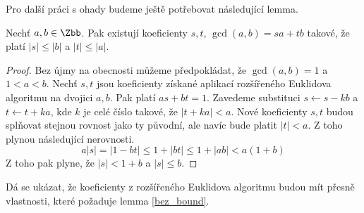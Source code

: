 Pro další práci s ohady budeme ještě potřebovat následující lemma.
\begin{lem} \label{bez_bound}
Nechť $ a, b \in \Zbb $. Pak existují koeficienty
$ s, t $, $ \gcd(a, b) = s a + t b $ takové, že platí $ |s| \leq |b| $ a
$ |t| \leq |a| $.
\end{lem}
\begin{proof}
Bez újmy na obecnosti můžeme předpokládat, že $ \gcd(a, b) = 1 $ a $ 1 < a < b $.
Nechť $ s, t $ jsou koeficienty získané aplikací rozšířeného Euklidova algoritmu
na dvojici $ a, b $. Pak platí $ a s + b t = 1 $. Zavedeme substituci
$ s \leftarrow s - k b $ a $ t \leftarrow t + k a $, kde $ k $ je celé číslo takové, že
$ |t + k a| < a $. Nové koeficienty $ s,t $ budou splňovat stejnou rovnost
jako ty původní, ale navíc bude platit $ |t| < a $. Z toho plynou následující
nerovnosti.
\begin{equation*}
    a |s| = | 1 - bt | \leq 1 + |bt| \leq 1 + |ab| < a(1 + b)
\end{equation*}
Z toho pak plyne, že $ |s| < 1 + b $ a $ |s| \leq b $.
\end{proof}
\begin{pozn}
Dá se ukázat, že koeficienty z rozšířeného Euklidova algoritmu budou mít přesně
vlastnosti, které požaduje lemma \ref{bez_bound}.
\end{pozn}



